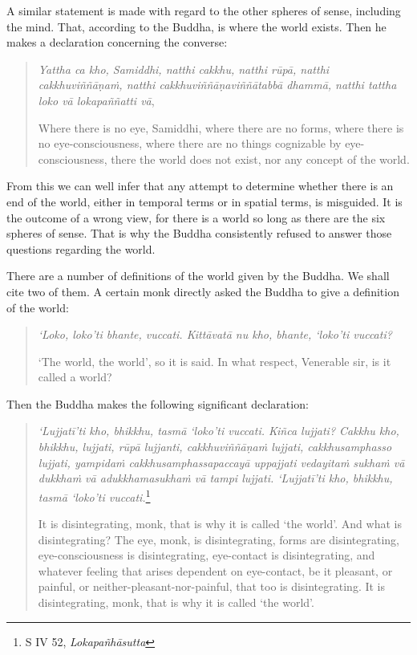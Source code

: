 A similar statement is made with regard to the other spheres of sense, including the mind. That, according to the Buddha, is where the world exists. Then he makes a declaration concerning the converse:

\begin{quote}
\emph{Yattha ca kho, Samiddhi, natthi cakkhu, natthi rūpā, natthi cakkhuviññāṇaṁ, natthi cakkhuviññāṇaviññātabbā dhammā, natthi tattha loko vā lokapaññatti vā},

Where there is no eye, Samiddhi, where there are no forms, where there is no eye-consciousness, where there are no things cognizable by eye-consciousness, there the world does not exist, nor any concept of the world.
\end{quote}

From this we can well infer that any attempt to determine whether there is an end of the world, either in temporal terms or in spatial terms, is misguided. It is the outcome of a wrong view, for there is a world so long as there are the six spheres of sense. That is why the Buddha consistently refused to answer those questions regarding the world.

There are a number of definitions of the world given by the Buddha. We shall cite two of them. A certain monk directly asked the Buddha to give a definition of the world:

\begin{quote}
\emph{`Loko, loko'ti bhante, vuccati. Kittāvatā nu kho, bhante, `loko'ti vuccati?}

`The world, the world', so it is said. In what respect, Venerable sir, is it called a world?
\end{quote}

Then the Buddha makes the following significant declaration:

\begin{quote}
\emph{`Lujjatī'ti kho, bhikkhu, tasmā `loko'ti vuccati. Kiñca lujjati? Cakkhu kho, bhikkhu, lujjati, rūpā lujjanti, cakkhuviññāṇaṁ lujjati, cakkhusamphasso lujjati, yampidaṁ cakkhusamphassapaccayā uppajjati vedayitaṁ sukhaṁ vā dukkhaṁ vā adukkhamasukhaṁ vā tampi lujjati. `Lujjatī'ti kho, bhikkhu, tasmā `loko'ti vuccati.}\footnote{S IV 52, \emph{Lokapañhāsutta}}

It is disintegrating, monk, that is why it is called `the world'. And what is disintegrating? The eye, monk, is disintegrating, forms are disintegrating, eye-consciousness is disintegrating, eye-contact is disintegrating, and whatever feeling that arises dependent on eye-contact, be it pleasant, or painful, or neither-pleasant-nor-painful, that too is disintegrating. It is disintegrating, monk, that is why it is called `the world'.
\end{quote}

